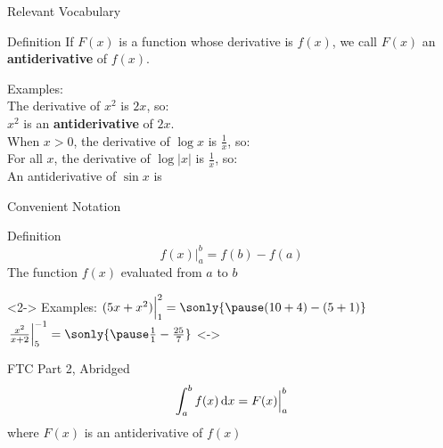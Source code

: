 \begin{frame}[t]{Relevant Vocabulary}
 


\begin{block}{Definition}
If $F(x)$ is a function whose derivative is $f(x)$, we call $F(x)$ an \textbf{antiderivative} of $f(x)$.
\end{block}\pause\vfill
Examples:\\
The derivative of $x^2$ is $2x$, so:\\
$x^2$ is an \textbf{antiderivative} of $2x$.\\ \pause\vfill
When $x>0$, the derivative of $\log x $ is $\frac1x$, so:\\\pause
{}
\vfill
For all $x$, the derivative of $\log |x| $ is $\frac1x$, so:\\
 \vfill\pause
An antiderivative of $\sin x$ is  
\end{frame}
\begin{frame}[t]{Convenient Notation}
\iftoggle{spoiler}{\COPY{5}{\endslide}}{\COPY{3}{\endslide}}

\begin{block}{Definition}
	\[f(x)\Big|_a^b = f(b)-f(a) \]
	The function $f(x)$ evaluated from $a$ to $b$
\end{block}\pause
\only<2-\endslide>{\vfill
Examples:\vfill
$ (5x+x^2) \Big|_1^2= \sonly{\pause(10+4)-(5+1)}$\pause\vfill
$\left. \frac{x^2}{x+2} \right|_{5}^{-1}=\sonly{\pause \frac{1}{1}-\frac{25}{7}}$\vfill}
\only<\endslideb->{\begin{block}{FTC Part 2, Abridged}
\[\int_a^b f(x)\,\text{d} x = F(x)\Big|_a^b\]
where $F(x)$ is an antiderivative of $f(x)$
\end{block}}
\end{frame}
